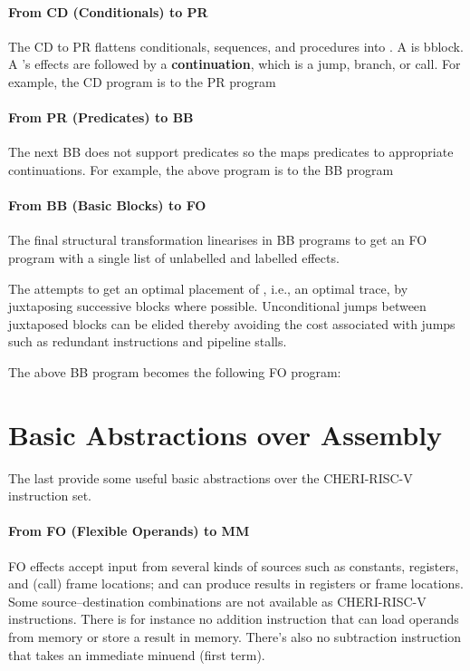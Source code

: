 \documentclass[main.tex]{subfiles}
\begin{document}
\paragraph{From CD (Conditionals) to PR} The CD to PR  flattens conditionals, sequences, and procedures into . A \textbf{} is \glsdesc*{bblock}. A 's effects are followed by a \textbf{continuation}, which is a jump, branch, or call. For example, the CD program
is \lowered{} to the PR program

\paragraph{From PR (Predicates) to BB} The next  BB does not support predicates so the  maps predicates to appropriate continuations. For example, the above program is \lowered{} to the BB program

\paragraph{From BB (Basic Blocks) to FO} The final structural transformation linearises  in BB programs to get an FO program with a single list of unlabelled and labelled effects.

The  attempts to get an optimal placement of , i.e., an optimal trace, by juxtaposing successive blocks where possible. Unconditional jumps between juxtaposed blocks can be elided thereby avoiding the cost associated with jumps such as redundant instructions and pipeline stalls.

The above BB program becomes the following FO program:

\section{Basic Abstractions over Assembly} \label{sct:fo}
The last  provide some useful basic abstractions over the CHERI-RISC-V instruction set.

\paragraph{From FO (Flexible Operands) to MM} FO effects accept input from several kinds of sources such as constants, registers, and (call) frame locations; and can produce results in registers or frame locations. Some source–destination combinations are not available as CHERI-RISC-V instructions. There is for instance no addition instruction that can load operands from memory or store a result in memory. There's also no subtraction instruction that takes an immediate minuend (first term).
\end{document}
